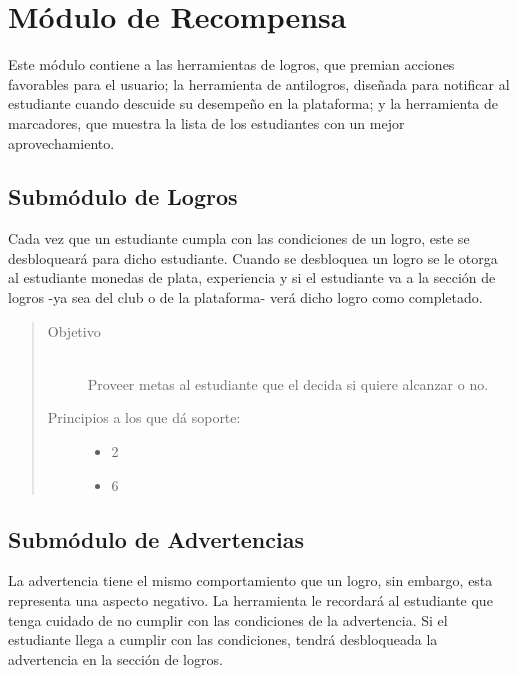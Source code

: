 

\chapter{Módulo de Recompensa}
\label{mod:recompensa}

    Este módulo contiene a las herramientas de logros, que premian acciones favorables para el usuario; la herramienta de antilogros, diseñada para notificar al estudiante cuando descuide su desempeño en la plataforma; y la herramienta de marcadores, que muestra la lista de los estudiantes con un mejor aprovechamiento.

\section{Submódulo de Logros}

    Cada vez que un estudiante cumpla con las condiciones de un logro, este se desbloqueará para dicho estudiante. Cuando se desbloquea un logro se le otorga al estudiante monedas de plata, experiencia y si el estudiante va a la sección de logros -ya sea del club o de la plataforma- verá dicho logro como completado.

    \begin{quote}
    \begin{description}
    \item[Objetivo] \hfill\\
        Proveer metas al estudiante que el decida si quiere alcanzar o no.

    \item[Principios a los que dá soporte:] \hfill
        \begin{itemize}
            \item 2 \principioII
            \item 6 \principioVI
        \end{itemize}
    \end{description}
    \end{quote}

\section{Submódulo de Advertencias}

    La advertencia tiene el mismo comportamiento que un logro, sin embargo, esta representa una aspecto negativo. La herramienta le recordará al estudiante que tenga cuidado de no cumplir con las condiciones de la advertencia. Si el estudiante llega a cumplir con las condiciones, tendrá desbloqueada la advertencia en la sección de logros.

